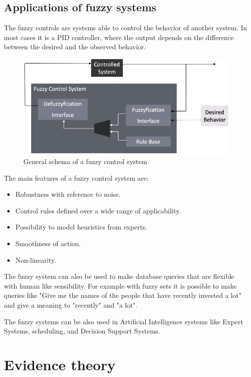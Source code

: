\documentclass[12pt, a4paper]{report}
\begin{document}
    \section{Applications of fuzzy systems}
    The fuzzy controls are systems able to control the behavior of another system. In most cases it is a PID controller, where the output
    depends on the difference between the desired and the observed behavior. 
    \begin{figure}[H]
        \centering
        \includegraphics[width=0.5\linewidth]{images/control.png}
        \caption{General schema of a fuzzy control system}
    \end{figure}
    The main features of a fuzzy control system are: 
    \begin{itemize}
        \item Robustness with reference to noise.
        \item Control rules defined over a wide range of applicability.
        \item Possibility to model heuristics from experts.
        \item Smoothness of action.
        \item Non-linearity.
    \end{itemize}

    The fuzzy system can also be used to make database queries that are flexible with human like sensibility. For example with fuzzy sets it
    is possible to make queries like "Give me the names of the people that have recently invested a lot" and give a meaning to "recently" and 
    "a lot". 

    The fuzzy systems can be also used in Artificial Intelligence systems like Expert Systems, scheduling, and Decision Support Systems.

    \newpage

    \chapter{Evidence theory}
\end{document}

